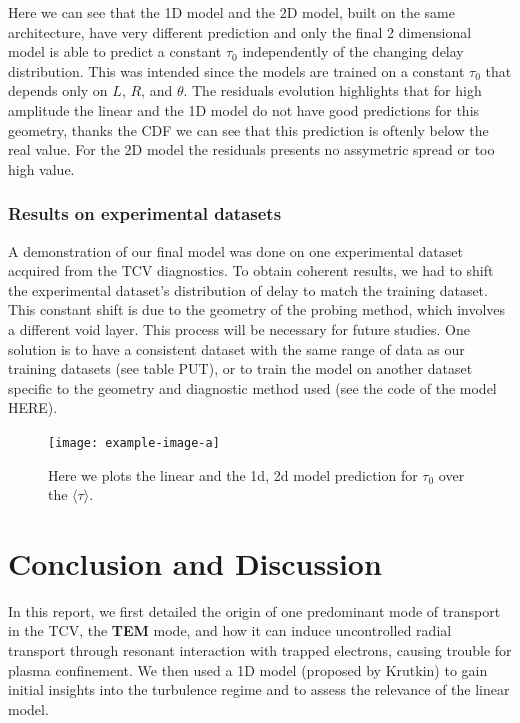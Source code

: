 \documentclass[11pt,a4paper,openany]{report}
\begin{document}
\begin{multicols}{2}
    Here we can see that the 1D model and the 2D model, built on the same architecture, have very different prediction and only the final 2 dimensional model is able to predict a constant \(\tau_0\) independently of the changing delay distribution. This was intended since the models are trained on a constant \(\tau_0\) that depends only on \(L\), \(R\), and \(\theta\). The residuals evolution highlights that for high amplitude the linear and the 1D model do not have good predictions for this geometry, thanks the CDF we can see that this prediction is oftenly below the real value. For the 2D model the residuals presents no assymetric spread or too high value.
    \subsection{Results on experimental datasets}

    A demonstration of our final model was done on one experimental dataset acquired from the TCV diagnostics. To obtain coherent results, we had to shift the experimental dataset's distribution of delay to match the training dataset. This constant shift is due to the geometry of the probing method, which involves a different void layer. This process will be necessary for future studies. One solution is to have a consistent dataset with the same range of data as our training datasets (see table PUT), or to train the model on another dataset specific to the geometry and diagnostic method used (see the code of the model HERE).

    \begin{figure}[H]
        \centering
        \texttt{[image: example-image-a]}
        \label{}
        \caption{Here we plots the linear and the 1d, 2d model prediction for $\tau_0$ over the $\langle \tau \rangle$.}
    \end{figure}

    \chapter{Conclusion and Discussion}

    In this report, we first detailed the origin of one predominant mode of transport in the TCV, the \textbf{TEM} mode, and how it can induce uncontrolled radial transport through resonant interaction with trapped electrons, causing trouble for plasma confinement. We then used a 1D model (proposed by Krutkin) to gain initial insights into the turbulence regime and to assess the relevance of the linear model.


\end{multicols}
\end{document}
